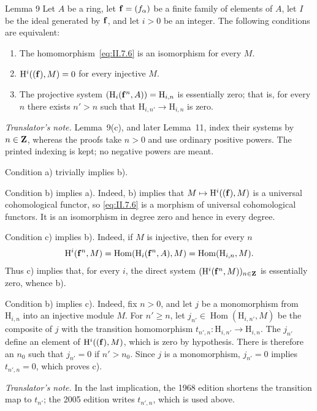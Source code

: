 \begin{sgastatement}{Lemma 9}
Let $A$ be a ring, let $\mathbf f=(f_\alpha)$ be a finite family of
elements of $A$, let $I$ be the ideal generated by $\mathbf f$, and let $i>0$ be
an integer. The following conditions are equivalent:
\begin{enumerate}[label=\textup{\alph*)},leftmargin=2.5em]
  \item The homomorphism~\eqref{eq:II.7.6} is an isomorphism for every $M$.
  \item $\mathrm H^i((\mathbf f),M)=0$ for every injective $M$.
  \item The projective system
  $(\mathrm H_i(\mathbf f^n,A))=\mathrm H_{i,n}$ is essentially zero; that is,
  for every $n$ there exists $n'>n$ such that
  $\mathrm H_{i,n'}\to\mathrm H_{i,n}$ is zero.
\end{enumerate}
\end{sgastatement}

\noindent\textit{Translator's note.} Lemma~9(c), and later Lemma~11, index
their systems by $n\in\mathbf Z$, whereas the proofs take $n>0$ and use ordinary
positive powers. The printed indexing is kept; no negative powers are
meant.

Condition a) trivially implies b).

Condition b) implies a). Indeed, b) implies that
$M\mapsto\mathrm H^i((\mathbf f),M)$ is a universal cohomological functor, so
\eqref{eq:II.7.6} is a morphism of universal cohomological functors. It is an
isomorphism in degree zero and hence in every degree.

Condition c) implies b). Indeed, if $M$ is injective, then for every $n$
\[
  \mathrm H^i(\mathbf f^n,M)
  =\operatorname{Hom}(\mathrm H_i(\mathbf f^n,A),M)
  =\operatorname{Hom}(\mathrm H_{i,n},M).
\]
Thus c) implies that, for every $i$, the direct system
$(\mathrm H^i(\mathbf f^n,M))_{n\in\mathbf Z}$ is essentially zero, whence b).

Condition b) implies c). Indeed, fix $n>0$, and let $j$ be a monomorphism
from $\mathrm H_{i,n}$ into an injective module $M$. For $n'\geq n$, let
$j_{n'}\in\operatorname{Hom}(\mathrm H_{i,n'},M)$ be the composite of $j$
with the transition homomorphism
$t_{n',n}\colon\mathrm H_{i,n'}\to\mathrm H_{i,n}$. The $j_{n'}$ define an
element of $\mathrm H^i((\mathbf f),M)$, which is zero by hypothesis. There is
therefore an $n_0$ such that $j_{n'}=0$ if $n'>n_0$. Since $j$ is a
monomorphism, $j_{n'}=0$ implies $t_{n',n}=0$, which proves c).

\noindent\textit{Translator's note.} In the last implication, the 1968
edition shortens the transition map to $t_{n'}$; the 2005 edition writes
$t_{n',n}$, which is used above.

